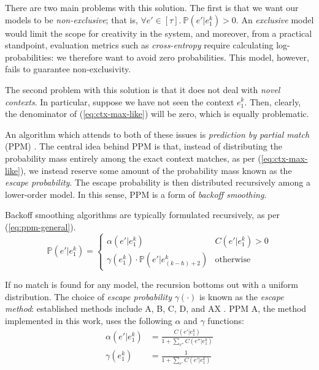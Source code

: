 \documentclass[12pt,a4paper,twoside,openright]{report}
\begin{document}
There are two main problems with this solution. The first is that we want our
models to be \emph{non-exclusive}; that is, $\forall e' \in [\tau].\
\mathbb{P}(e' | e_1^k) > 0$. An \emph{exclusive} model would limit the scope for
creativity in the system, and moreover, from a practical standpoint, evaluation
metrics such as \emph{cross-entropy} require calculating log-probabilities: we
therefore want to avoid zero probabilities. This model, however, fails to
guarantee non-exclusivity.

The second problem with this solution is that it does not deal with \emph{novel
contexts}. In particular, suppose we have not seen the context $e_1^k$. Then,
clearly, the denominator of (\ref{eq:ctx-max-like}) will be zero, which is
equally problematic.

An algorithm which attends to both of these issues is \emph{prediction by
partial match} (PPM) \cite{cleary1984ppm}. The central idea behind PPM is that,
instead of distributing the probability mass entirely among the exact context
matches, as per (\ref{eq:ctx-max-like}), we instead reserve some amount of the
probability mass known as the \emph{escape probability}. The escape probability
is then distributed recursively among a lower-order model. In this sense, PPM
is a form of \emph{backoff smoothing}.

Backoff smoothing algorithms are typically formulated recursively, as per
(\ref{eq:ppm-general}).
\begin{equation}\label{eq:ppm-general}
  \mathbb{P}(e' | e_1^k) = \begin{cases}
  \alpha(e'|e_1^k) & C(e' | e_1^k) > 0 \\
\gamma(e_1^k) \cdot \mathbb{P}(e' | e_{(k - \hbar) + 2}^k) & \text{otherwise}
\end{cases} 
\end{equation} 

If no match is found for any model, the recursion bottoms out with a uniform
distribution. The choice of \emph{escape probability} $\gamma(\cdot)$ is known
as the \emph{escape method}: established methods include A, B, C, D, and AX
\cite{pearce2004improved}. PPM A, the method implemented in this work, uses the
following $\alpha$ and $\gamma$ functions:
\begin{align}
  \label{eq:ppm-a}
  \alpha(e' | e_1^k) &= \frac{ C(e' | e_1^k) }{ 1 + \sum_{e''} C(e'' | e_1^k) }
  \\
  \gamma(e_1^k) &= \frac{ 1 }{ 1 + \sum_{e'} C(e' | e_1^k) }
  \label{eq:ppm-escape}
\end{align}
\end{document}
